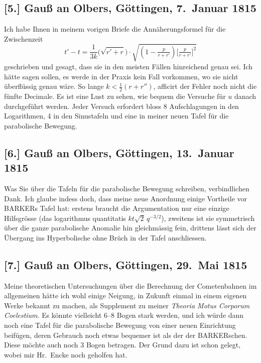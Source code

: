 \documentclass[11pt,a4paper]{article}
\begin{document}
\subsection*{[5.] Gau\ss{} an Olbers, G\"ottingen, 7.~Januar 1815}

\medskip

Ich habe Ihnen in meinem vorigen Briefe die Ann\"aherungsformel f\"ur
die Zwischenzeit
\[
  t' - t = \frac{1}{3k}\bigl(\sqrt{r' + r}\bigr)
            \cdot\sqrt{(1 - \tfrac{p}{r + r'})\bigl[\tfrac{p}{r + r'}\bigr]^{2}}
\]
geschrieben und gesagt, dass sie in den meisten F\"allen hinreichend
genau sei. Ich h\"atte sagen sollen, es werde in der Praxis kein Fall
vorkommen, wo sie nicht \"uberfl\"ussig genau w\"are. So lange
$k < \tfrac{1}{2}(r + r'')$, afficirt der Fehler noch nicht die
f\"unfte Decimale. Es ist eine Lust zu sehen, wie bequem die Versuche
f\"ur $u$ danach durchgef\"uhrt werden. Jeder Versuch erfordert bloss
8 Aufschlagungen in den Logarithmen, 4 in den Sinustafeln und eine
in meiner neuen Tafel f\"ur die parabolische Bewegung.

\medskip

\subsection*{[6.] Gau\ss{} an Olbers, G\"ottingen, 13.~Januar 1815}

\medskip

Was Sie \"uber die Tafeln f\"ur die parabolische Bewegung schreiben,
verbindlichen Dank. Ich glaube indess doch, dass meine neue Anordnung
einige Vortheile vor BARKERs Tafel hat: erstens braucht die Argumentation
nur eine einzige Hilfsgr\"osse (das logarithmus quantitatis $kt\sqrt{2}\,q^{-3/2}$),
zweitens ist sie symmetrisch \"uber die ganze parabolische Anomalie hin
gleichm\"assig fein, drittens l\"asst sich der \"Ubergang ins Hyperbolische
ohne Br\"uch in der Tafel anschliessen.

\medskip

\subsection*{[7.] Gau\ss{} an Olbers, G\"ottingen, 29.~Mai 1815}

\medskip

Meine theoretischen Untersuchungen \"uber die Berechnung der
Cometenbahnen im allgemeinen h\"atte ich wohl einige Neigung, in
Zukunft einmal in einem eigenen Werke bekannt zu machen, als Supplement
zu meiner \textit{Theoria Motus Corporum Coelestium}. Es k\"onnte
vielleicht 6--8 Bogen stark werden, und ich w\"urde dann noch eine Tafel
f\"ur die parabolische Bewegung von einer neuen Einrichtung beif\"ugen,
deren Gebrauch noch etwas bequemer ist als der der BARKERschen. Diese
m\"ochte auch noch 3 Bogen betragen. Der Grund dazu ist schon gelegt,
wobei mir Hr.~Encke noch geholfen hat.
\end{document}
